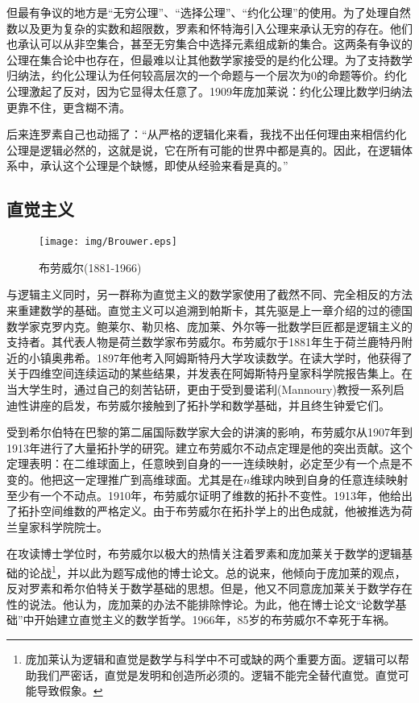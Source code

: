 \documentclass{article}
\begin{document}
但最有争议的地方是“无穷公理”、“选择公理”、“约化公理”的使用。为了处理自然数以及更为复杂的实数和超限数，罗素和怀特海引入公理来承认无穷的存在。他们也承认可以从非空集合，甚至无穷集合中选择元素组成新的集合。这两条有争议的公理在集合论中也存在，但最难以让其他数学家接受的是约化公理。为了支持数学归纳法，约化公理认为任何较高层次的一个命题与一个层次为0的命题等价。约化公理激起了反对，因为它显得太任意了。1909年庞加莱说：约化公理比数学归纳法更靠不住，更含糊不清。

后来连罗素自己也动摇了：“从严格的逻辑化来看，我找不出任何理由来相信约化公理是逻辑必然的，这就是说，它在所有可能的世界中都是真的。因此，在逻辑体系中，承认这个公理是个缺憾，即使从经验来看是真的。”\cite{M-Kline-2007}

\subsection{直觉主义}

\begin{wrapfigure}{L}{0.4\textwidth}
 \centering
 \texttt{[image: img/Brouwer.eps]}
 \captionsetup{labelformat=empty}
 \caption{布劳威尔(1881-1966)}
 \label{fig:Brouwer}
\end{wrapfigure}


与逻辑主义同时，另一群称为直觉主义的数学家使用了截然不同、完全相反的方法来重建数学的基础。直觉主义可以追溯到帕斯卡，其先驱是上一章介绍的过的德国数学家克罗内克。鲍莱尔、勒贝格、庞加莱、外尔等一批数学巨匠都是逻辑主义的支持者。其代表人物是荷兰数学家布劳威尔。布劳威尔于1881年生于荷兰鹿特丹附近的小镇奥弗希。1897年他考入阿姆斯特丹大学攻读数学。在读大学时，他获得了关于四维空间连续运动的某些结果，并发表在阿姆斯特丹皇家科学院报告集上。在当大学生时，通过自己的刻苦钻研，更由于受到曼诺利(Mannoury)教授一系列启迪性讲座的启发，布劳威尔接触到了拓扑学和数学基础，并且终生钟爱它们。

受到希尔伯特在巴黎的第二届国际数学家大会的讲演的影响，布劳威尔从1907年到1913年进行了大量拓扑学的研究。建立布劳威尔不动点定理是他的突出贡献。这个定理表明：在二维球面上，任意映到自身的一一连续映射，必定至少有一个点是不变的。他把这一定理推广到高维球面。尤其是在$n$维球内映到自身的任意连续映射至少有一个不动点。1910年，布劳威尔证明了维数的拓扑不变性。1913年，他给出了拓扑空间维数的严格定义。由于布劳威尔在拓扑学上的出色成就，他被推选为荷兰皇家科学院院士。

在攻读博士学位时，布劳威尔以极大的热情关注着罗素和庞加莱关于数学的逻辑基础的论战\footnote{庞加莱认为逻辑和直觉是数学与科学中不可或缺的两个重要方面。逻辑可以帮助我们严密话，直觉是发明和创造所必须的。逻辑不能完全替代直觉。直觉可能导致假象\cite{Poincare2}。}，并以此为题写成他的博士论文。总的说来，他倾向于庞加莱的观点，反对罗素和希尔伯特关于数学基础的思想。但是，他又不同意庞加莱关于数学存在性的说法。他认为，庞加莱的办法不能排除悖论。为此，他在博士论文“论数学基础”中开始建立直觉主义的数学哲学。1966年，85岁的布劳威尔不幸死于车祸。
\end{document}
